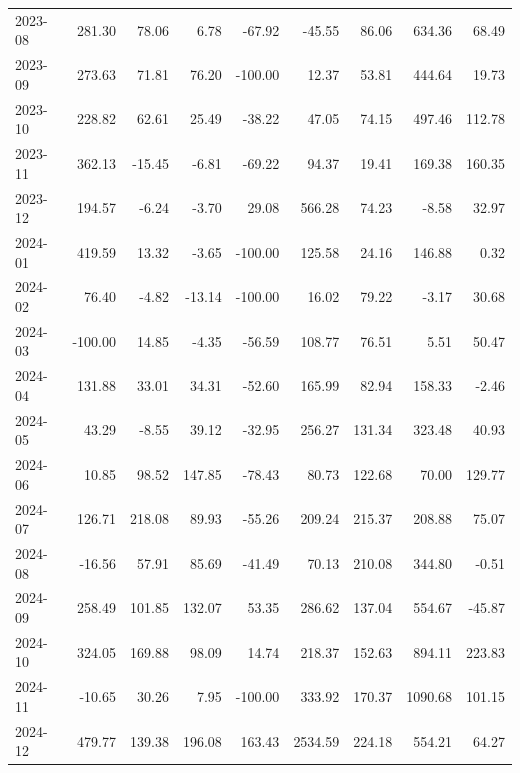\begin{table}[ht]
\begin{tabular}{lrrrrrrrr}
  2023-08 & 281.30 & 78.06 & 6.78 & -67.92 & -45.55 & 86.06 & 634.36 & 68.49 \\ 
  2023-09 & 273.63 & 71.81 & 76.20 & -100.00 & 12.37 & 53.81 & 444.64 & 19.73 \\ 
  2023-10 & 228.82 & 62.61 & 25.49 & -38.22 & 47.05 & 74.15 & 497.46 & 112.78 \\ 
  2023-11 & 362.13 & -15.45 & -6.81 & -69.22 & 94.37 & 19.41 & 169.38 & 160.35 \\ 
  2023-12 & 194.57 & -6.24 & -3.70 & 29.08 & 566.28 & 74.23 & -8.58 & 32.97 \\ 
  2024-01 & 419.59 & 13.32 & -3.65 & -100.00 & 125.58 & 24.16 & 146.88 & 0.32 \\ 
  2024-02 & 76.40 & -4.82 & -13.14 & -100.00 & 16.02 & 79.22 & -3.17 & 30.68 \\ 
  2024-03 & -100.00 & 14.85 & -4.35 & -56.59 & 108.77 & 76.51 & 5.51 & 50.47 \\ 
  2024-04 & 131.88 & 33.01 & 34.31 & -52.60 & 165.99 & 82.94 & 158.33 & -2.46 \\ 
  2024-05 & 43.29 & -8.55 & 39.12 & -32.95 & 256.27 & 131.34 & 323.48 & 40.93 \\ 
  2024-06 & 10.85 & 98.52 & 147.85 & -78.43 & 80.73 & 122.68 & 70.00 & 129.77 \\ 
  2024-07 & 126.71 & 218.08 & 89.93 & -55.26 & 209.24 & 215.37 & 208.88 & 75.07 \\ 
  2024-08 & -16.56 & 57.91 & 85.69 & -41.49 & 70.13 & 210.08 & 344.80 & -0.51 \\ 
  2024-09 & 258.49 & 101.85 & 132.07 & 53.35 & 286.62 & 137.04 & 554.67 & -45.87 \\ 
  2024-10 & 324.05 & 169.88 & 98.09 & 14.74 & 218.37 & 152.63 & 894.11 & 223.83 \\ 
  2024-11 & -10.65 & 30.26 & 7.95 & -100.00 & 333.92 & 170.37 & 1090.68 & 101.15 \\ 
  2024-12 & 479.77 & 139.38 & 196.08 & 163.43 & 2534.59 & 224.18 & 554.21 & 64.27 \\ 
   \hline
\end{tabular}
\end{table}
